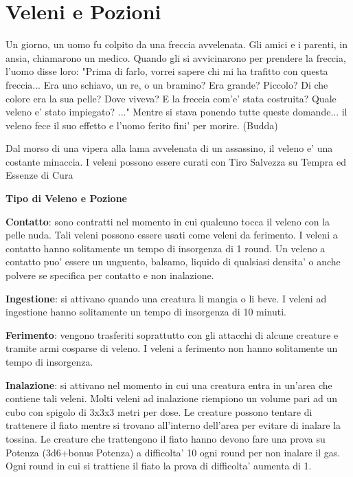 \documentclass[a4paper,11pt,twoside,openany]{dndbook}
\begin{document}
\pagebreak


\section{Veleni e Pozioni}

\label{veleni-e-pozioni}


\begin{quotebox}
Un giorno, un uomo fu colpito da una freccia avvelenata. Gli amici e i parenti, in ansia, chiamarono un medico. Quando gli si avvicinarono per prendere la freccia, l'uomo disse loro: "Prima di farlo, vorrei sapere chi mi ha trafitto con questa freccia... Era uno schiavo, un re, o un bramino? Era grande? Piccolo? Di che colore era la sua pelle? Dove viveva? E la freccia com'e' stata costruita? Quale veleno e' stato impiegato? ..." Mentre si stava ponendo tutte queste domande... il veleno fece il suo effetto e l'uomo ferito fini' per morire. (Budda)
\end{quotebox}


Dal morso di una vipera alla lama avvelenata di un assassino, il veleno e' una costante minaccia. I veleni possono essere curati con Tiro Salvezza su Tempra ed Essenze di Cura

\bigskip

\textbf{Tipo di Veleno e Pozione}

\textbf{Contatto}: sono contratti nel momento in cui qualcuno tocca il veleno con la pelle nuda. Tali veleni possono essere usati come veleni da ferimento. I veleni a contatto hanno solitamente un tempo di insorgenza di 1 round. Un veleno a contatto puo' essere un unguento, balsamo, liquido di qualsiasi densita' o anche polvere se specifica per contatto e non inalazione.

\textbf{Ingestione}: si attivano quando una creatura li mangia o li beve. I veleni ad ingestione hanno solitamente un tempo di insorgenza di 10 minuti.

\textbf{Ferimento}: vengono trasferiti soprattutto con gli attacchi di alcune creature e tramite armi cosparse di veleno. I veleni a ferimento non hanno solitamente un tempo di insorgenza. 

\textbf{Inalazione}: si attivano nel momento in cui una creatura entra in un'area che contiene tali veleni. Molti veleni ad inalazione riempiono un volume pari ad un cubo con spigolo di 3x3x3 metri per dose. Le creature possono tentare di trattenere il fiato mentre si trovano all'interno dell'area per evitare di inalare la tossina. Le creature che trattengono il fiato hanno devono fare una prova su Potenza (3d6+bonus Potenza) a difficolta' 10 ogni round per non inalare il gas. Ogni round in cui si trattiene il fiato la prova di difficolta' aumenta di 1.
\end{document}
